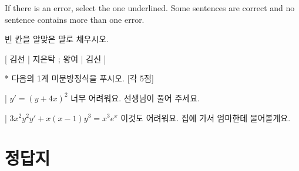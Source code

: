 \documentclass[a4paper]{oblivoir}
\begin{document}
\begin{QAwrite}
\begin{premise}[3]
If there is an error, select the one underlined. Some sentences are correct and no sentence contains more than one error. 
\end{premise}



\end{QAwrite}

\begin{QAwrite}
\begin{premise}
빈 칸을 알맞은 말로 채우시오.
\end{premise}


\end{QAwrite}


\begin{QAwrite}
[ 
김선 | 
지은탁 ; 
왕여 | 
김신 
]{
}
\end{QAwrite}

\begin{QAwrite}
\begin{premise}*
다음의 1계 미분방정식을 푸시오. [각 5점]
\end{premise}

\qa*|{
$y' = (y + 4x)^2$
}{
너무 어려워요.
선생님이 풀어 주세요.
}

\qa*|{
$3x^2y^2y' + x(x - 1)y^3 = x^3e^x$
}{
이것도 어려워요.
집에 가서 엄마한테 물어볼게요.
}
\end{QAwrite}

\section{정답지}
\InputAnswersSheet
\end{document}
